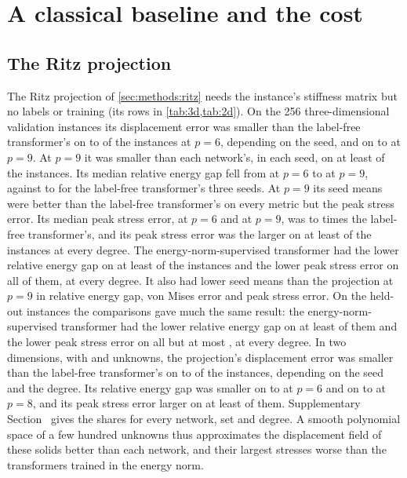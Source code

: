 \section{A classical baseline and the cost}\label{sec:cost}

\subsection{The Ritz projection}\label{sec:cost:ritz}

The Ritz projection of \cref{sec:methods:ritz} needs the instance's stiffness matrix but no
labels or training (its rows in \cref{tab:3d,tab:2d}). On the 256 three-dimensional
validation instances its displacement error was smaller than the label-free transformer's on
\numRitzValFreeDispSixMin{} to \numRitzValFreeDispSixMax{} of the instances at $p=6$,
depending on the seed, and on \numRitzValFreeDispNineMin{} to \numRitzValFreeDispNineMax{} at $p=9$. At $p=9$ it was
smaller than each network's, in each seed, on at least
\numRitzValNineDispAll{} of the instances. Its median relative energy gap fell from
\numRitzValGapSix{} at $p=6$ to \numRitzValGapNine{} at $p=9$, against \numKdFreeMedMin{} to
\numKdFreeMedMax{} for the label-free transformer's three seeds. At $p=9$ its seed means were better than the label-free transformer's on every metric but the peak stress error. Its
median peak stress error, \numRitzValPeakSix{} at $p=6$ and \numRitzValPeakNine{} at $p=9$,
was \numRitzValPeakRatioMin{} to \numRitzValPeakRatioMax{} times the label-free
transformer's, and its peak stress error was the larger on at least \numRitzValFreePeakMin{}
of the instances at every degree. The energy-norm-supervised transformer had the lower
relative energy gap on at least \numRitzValKnormGapMin{} of the instances and the lower peak stress error on all of them, at every degree. It also had lower seed means
than the projection at
$p=9$ in relative energy gap, von Mises error and peak stress error. On the held-out
instances the comparisons gave much the same result: the energy-norm-supervised transformer had the
lower relative energy gap on at least \numRitzHoldKnormGapMin{} of them and the lower peak
stress error on all but at most \numRitzHoldKnormPeakMiss{}, at every degree. In two
dimensions, with \numRitzTwoKSix{} and \numRitzTwoKEight{} unknowns, the projection's
displacement error was smaller than the label-free transformer's on \numRitzTwoFreeDispMin{}
to \numRitzTwoFreeDispMax{} of the instances, depending on the seed and the degree. Its relative energy gap was smaller on \numRitzTwoFreeGapSixMin{} to \numRitzTwoFreeGapSixMax{} at
$p=6$ and on \numRitzTwoFreeGapEightMin{} to \numRitzTwoFreeGapEightMax{} at $p=8$, and its
peak stress error larger on at least \numRitzTwoFreePeakMin{} of them. Supplementary
Section~\SuppRitz{} gives the shares for every network, set and degree. A smooth polynomial
space of a few hundred unknowns thus approximates the displacement field of these solids
better than each network, and their largest stresses worse than the transformers trained in
the energy norm.

